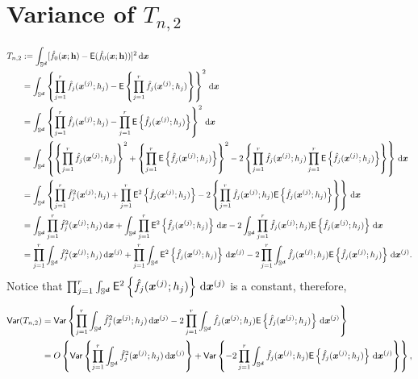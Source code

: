 \documentclass{article}
\begin{document}
\section{Variance of $T_{n,2}$}

\begin{align*}
    T_{n,2} & \defin \int_{\Sr} [ \hat{f}_{0}(\bx;\bh) - \mathsf{E} (\hat{f}_{0}(\bx;\bh)) ]^2 \,\rd \bx \\
    &= \int_{\Sr} \lrb{ \prod_{j=1}^{r} \hat{f}_{j}(\bx^{(j)};h_j) - \mathsf{E} \lrb{\prod_{j=1}^{r} \hat{f}_{j}(\bx^{(j)};h_j)} }^2 \,\rd \bx \\
    &= \int_{\Sr} \lrb{ \prod_{j=1}^{r} \hat{f}_{j}(\bx^{(j)};h_j) - \prod_{j=1}^{r} \mathsf{E} \lrb{ \hat{f}_{j}(\bx^{(j)};h_j)} }^2 \,\rd \bx \\
    &= \int_{\Sr} \lrb{ \lrb{\prod_{j=1}^{r} \hat{f}_{j}(\bx^{(j)};h_j)}^2 + \lrb{\prod_{j=1}^{r} \mathsf{E} \lrb{ \hat{f}_{j}(\bx^{(j)};h_j)}}^2 - 2\lrb{\prod_{j=1}^{r} \hat{f}_{j}(\bx^{(j)};h_j) \prod_{j=1}^{r} \mathsf{E} \lrb{ \hat{f}_{j}(\bx^{(j)};h_j)}} } \,\rd \bx \\
    &= \int_{\Sr} \lrb{ \prod_{j=1}^{r} \hat{f}_{j}^2(\bx^{(j)};h_j) + \prod_{j=1}^{r} \mathsf{E}^2 \lrb{ \hat{f}_{j}(\bx^{(j)};h_j)} - 2\lrb{\prod_{j=1}^{r} \hat{f}_{j}(\bx^{(j)};h_j) \mathsf{E} \lrb{ \hat{f}_{j}(\bx^{(j)};h_j)}} } \,\rd \bx \\
    &= \int_{\Sr} \prod_{j=1}^{r} \hat{f}_{j}^2(\bx^{(j)};h_j) \,\rd \bx + \int_{\Sr} \prod_{j=1}^{r} \mathsf{E}^2 \lrb{ \hat{f}_{j}(\bx^{(j)};h_j)} \,\rd \bx - 2 \int_{\Sr} \prod_{j=1}^{r} \hat{f}_{j}(\bx^{(j)};h_j) \mathsf{E} \lrb{ \hat{f}_{j}(\bx^{(j)};h_j)}  \,\rd \bx \\
    &= \prod_{j=1}^{r} \int_{\Sr} \hat{f}_{j}^2(\bx^{(j)};h_j) \,\rd \bx^{(j)} + \prod_{j=1}^{r} \int_{\Sr} \mathsf{E}^2 \lrb{ \hat{f}_{j}(\bx^{(j)};h_j)} \,\rd \bx^{(j)} - 2 \prod_{j=1}^{r} \int_{\Sr} \hat{f}_{j}(\bx^{(j)};h_j) \mathsf{E} \lrb{ \hat{f}_{j}(\bx^{(j)};h_j)}  \,\rd \bx^{(j)}. \\
\end{align*}
Notice that $\prod_{j=1}^{r} \int_{\Sr} \mathsf{E}^2 \lrb{ \hat{f}_{j}(\bx^{(j)};h_j)} \,\rd \bx^{(j)}$ is a constant, therefore,
\begin{align*}
    \mathsf{Var}(T_{n,2}) &= \mathsf{Var} \lrb{\prod_{j=1}^{r} \int_{\Sr} \hat{f}_{j}^2(\bx^{(j)};h_j) \,\rd \bx^{(j)} - 2 \prod_{j=1}^{r} \int_{\Sr} \hat{f}_{j}(\bx^{(j)};h_j) \mathsf{E} \lrb{ \hat{f}_{j}(\bx^{(j)};h_j)}  \,\rd \bx^{(j)}} \\
    &= O \lrb{ \mathsf{Var} \lrb{\prod_{j=1}^{r} \int_{\Sr} \hat{f}_{j}^2(\bx^{(j)};h_j) \,\rd \bx^{(j)}} + \mathsf{Var} \lrb{- 2 \prod_{j=1}^{r} \int_{\Sr} \hat{f}_{j}(\bx^{(j)};h_j) \mathsf{E} \lrb{ \hat{f}_{j}(\bx^{(j)};h_j)}  \,\rd \bx^{(j)}}},
\end{align*}
\end{document}
